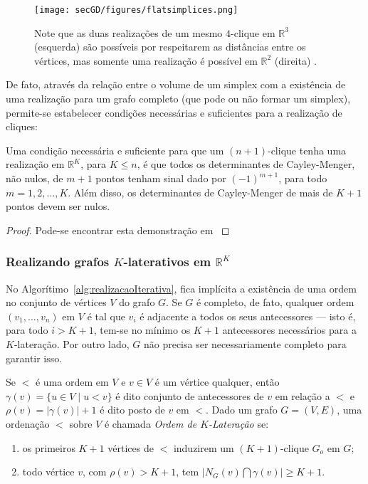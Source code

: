 \begin{figure}[H]
	\begin{center}
		\texttt{[image: secGD/figures/flatsimplices.png]}
	\end{center}
	\caption{Note que as duas realizações de um mesmo $4$-clique em $\mathbb{R}^3$ (esquerda) são possíveis por respeitarem as distâncias entre os vértices, mas somente uma realização é possível em $\mathbb{R}^{2}$ (direita) \cite{libertiEDG}.}
	\label{fig:flatsimplices}
\end{figure}

De fato, através da relação entre o volume de um simplex com a existência de uma realização para um grafo completo (que pode ou não formar um simplex), permite-se estabelecer condições necessárias e suficientes para a realização de cliques:

\begin{proposicao}
	Uma condição necessária e suficiente para que um $(n+1)$-clique tenha uma realização em $\mathbb{R}^K$, para $K\leq n$, é que todos os determinantes de Cayley-Menger, não nulos, de $m+1$ pontos tenham sinal dado por $(-1)^{m+1}$, para todo $m=1,2,\dots,K$. Além disso, os determinantes de Cayley-Menger de mais de $K+1$ pontos devem ser nulos.
	
	\begin{proof}
		Pode-se encontrar esta demonstração em \cite{correiaCondicoesNecessaESuficiDGPCayleyMenger}
	\end{proof}
\end{proposicao}

\subsubsection{Realizando grafos $K$-laterativos em $\mathbb{R}^K$ \label{sec:oi}}

No Algorítimo~\ref{alg:realizacaoIterativa}, fica implícita a existência de uma ordem no conjunto de vértices $V$ do grafo $G$. Se $G$ é completo, de fato, qualquer ordem $(v_1,\dots,v_n)$ em $V$ é tal que $v_i$ é adjacente a todos os seus antecessores --- isto é, para todo $i>K+1$, tem-se no mínimo os $K+1$ antecessores  necessários para a $K$-lateração. Por outro lado, $G$ não precisa ser necessariamente completo para garantir isso.

\begin{definicao}
	Se $<$ é uma ordem em $V$ e $v\in V$ é um vértice qualquer, então $\gamma(v) = \{u\in V \;|\; u<v \}$ é dito conjunto de antecessores de $v$ em relação a $<$ e $\rho(v) = |\gamma(v)|+1$ é dito posto de $v$ em $<$. Dado um grafo $G=(V,E)$, uma ordenação $<$ sobre $V$ é chamada \textit{Ordem de $K$-Lateração} se:
	\begin{enumerate}
		\vspace{-0.2cm}
		\item os primeiros $K+1$ vértices de $<$ induzirem um $(K+1)$-clique $G_o$ em $G$;
		\vspace{-0.2cm}
		\item todo vértice $v$, com $\rho(v) > K+1$, tem $\lvert N_G(v) \bigcap \gamma(v)\rvert \geq K+1$.
	\end{enumerate}
\end{definicao}

